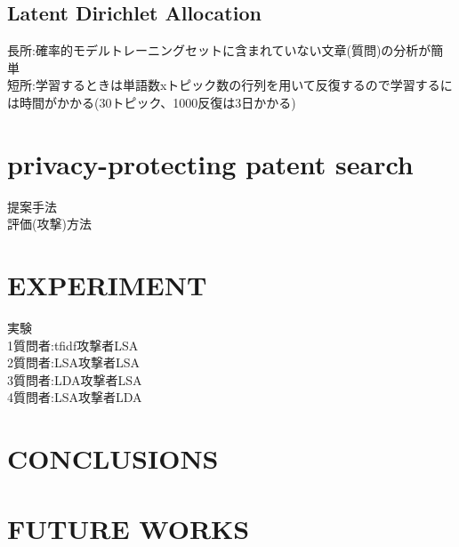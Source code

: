 \documentclass{jsarticle}
\theoremstyle{definition}
\begin{document}
\subsection{Latent Dirichlet Allocation}
長所:確率的モデルトレーニングセットに含まれていない文章(質問)の分析が簡単\\
短所:学習するときは単語数xトピック数の行列を用いて反復するので学習するには時間がかかる(30トピック、1000反復は3日かかる)
\section{privacy-protecting patent search}
提案手法\\
評価(攻撃)方法
\section{EXPERIMENT}
実験\\
1質問者:tfidf攻撃者LSA\\
2質問者:LSA攻撃者LSA\\
3質問者:LDA攻撃者LSA\\
4質問者:LSA攻撃者LDA
\section{CONCLUSIONS}
\section{FUTURE WORKS}
\end{document}
